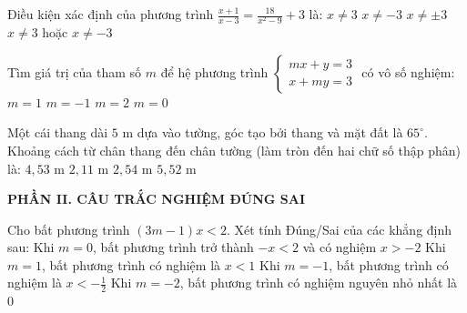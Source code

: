 \documentclass[12pt,a4paper]{article}
\begin{document}
\begin{ex}
Điều kiện xác định của phương trình $\frac{x+1}{x-3} = \frac{18}{x^2-9} + 3$ là:
\choice
{$x \neq 3$}
{$x \neq -3$}
{\True $x \neq \pm 3$}
{$x \neq 3$ hoặc $x \neq -3$}
\end{ex}

\begin{ex}
Tìm giá trị của tham số $m$ để hệ phương trình $\begin{cases} mx + y = 3 \\ x + my = 3 \end{cases}$ có vô số nghiệm:
\choice
{\True $m = 1$}
{$m = -1$}
{$m = 2$}
{$m = 0$}
\end{ex}

\begin{ex}
Một cái thang dài $5\text{ m}$ dựa vào tường, góc tạo bởi thang và mặt đất là $65^\circ$. Khoảng cách từ chân thang đến chân tường (làm tròn đến hai chữ số thập phân) là:
\choice
{$4{,}53\text{ m}$}
{\True $2{,}11\text{ m}$}
{$2{,}54\text{ m}$}
{$5{,}52\text{ m}$}
\end{ex}


\setcounter{ex}{0}
\noindent\textbf{\large PHẦN II. CÂU TRẮC NGHIỆM ĐÚNG SAI}
\vspace{1mm}
\begin{ex}
Cho bất phương trình $(3m - 1)x < 2$. Xét tính Đúng/Sai của các khẳng định sau:
\choiceTF
{\True Khi $m = 0$, bất phương trình trở thành $-x < 2$ và có nghiệm $x > -2$}
{\True Khi $m = 1$, bất phương trình có nghiệm là $x < 1$}
{Khi $m = -1$, bất phương trình có nghiệm là $x < -\frac{1}{2}$}
{\True Khi $m = -2$, bất phương trình có nghiệm nguyên nhỏ nhất là $0$}
\end{ex}
\end{document}
